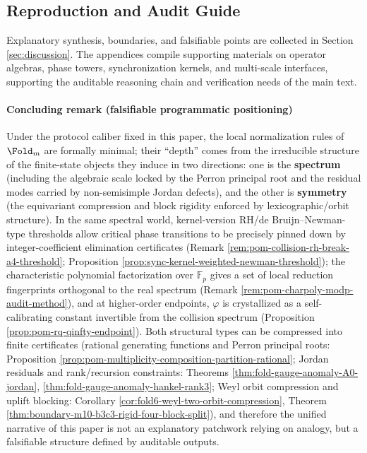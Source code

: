 \subsection{Reproduction and Audit Guide}\label{subsec:repro-audit-pointer}
Explanatory synthesis, boundaries, and falsifiable points are collected in Section \ref{sec:discussion}. The appendices compile supporting materials on operator algebras, phase towers, synchronization kernels, and multi-scale interfaces, supporting the auditable reasoning chain and verification needs of the main text.

\paragraph{Concluding remark (falsifiable programmatic positioning)}
Under the protocol caliber fixed in this paper, the local normalization rules of \(\Fold_m\) are formally minimal; their ``depth'' comes from the irreducible structure of the finite-state objects they induce in two directions: one is the \textbf{spectrum} (including the algebraic scale locked by the Perron principal root and the residual modes carried by non-semisimple Jordan defects), and the other is \textbf{symmetry} (the equivariant compression and block rigidity enforced by lexicographic/orbit structure).
In the same spectral world, kernel-version RH/de Bruijn--Newman-type thresholds allow critical phase transitions to be precisely pinned down by integer-coefficient elimination certificates (Remark \ref{rem:pom-collision-rh-break-a4-threshold}; Proposition \ref{prop:sync-kernel-weighted-newman-threshold}); the characteristic polynomial factorization over \(\mathbb{F}_p\) gives a set of local reduction fingerprints orthogonal to the real spectrum (Remark \ref{rem:pom-charpoly-modp-audit-method}), and at higher-order endpoints, \(\varphi\) is crystallized as a self-calibrating constant invertible from the collision spectrum (Proposition \ref{prop:pom-rq-qinfty-endpoint}).
Both structural types can be compressed into finite certificates (rational generating functions and Perron principal roots: Proposition \ref{prop:pom-multiplicity-composition-partition-rational}; Jordan residuals and rank/recursion constraints: Theorems \ref{thm:fold-gauge-anomaly-A0-jordan}, \ref{thm:fold-gauge-anomaly-hankel-rank3}; Weyl orbit compression and uplift blocking: Corollary \ref{cor:fold6-weyl-two-orbit-compression}, Theorem \ref{thm:boundary-m10-b3c3-rigid-four-block-split}),
and therefore the unified narrative of this paper is not an explanatory patchwork relying on analogy, but a falsifiable structure defined by auditable outputs.
